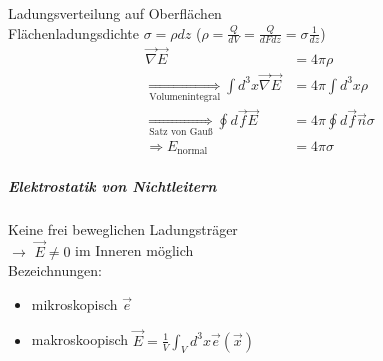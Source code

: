 \documentclass[a4paper]{article}
\begin{document}
Ladungsverteilung auf Oberflächen\\
Flächenladungsdichte $\sigma=\rho dz$ ($\rho=\frac{Q}{dV}=\frac{Q}{dF
dz}=\sigma \frac{1}{dz}$)
\begin{align}
\vec{\nabla}\vec{E}&=4\pi\rho\\
\underset{\text{Volumenintegral}}{\Rightarrow}\int d^3x \vec{\nabla}\vec{E}&=
4\pi \int d^3x \rho\\
\underset{\text{Satz von Gauß}}{\Rightarrow}\oint d\vec{f}\vec{E}&=4\pi\oint
d\vec{f}\vec{n}\sigma\\
\Rightarrow E_{\text{normal}}&=4\pi\sigma 
\end{align}

\subparagraph{Elektrostatik von Nichtleitern}
Keine frei beweglichen Ladungsträger\\
$\rightarrow$ $\vec{E}\neq0$ im Inneren möglich\\
Bezeichnungen:
\begin{itemize}
  \item mikroskopisch $\vec{e}$
  \item makroskoopisch $\vec{E}=\frac{1}{V}\int_V d^3x \vec{e}(\vec{x})$
\end{itemize}
\end{document}
